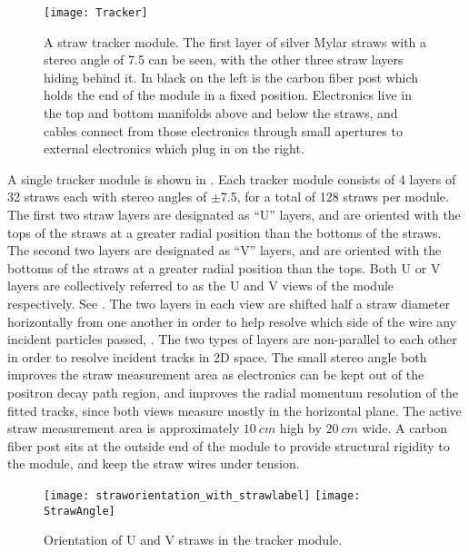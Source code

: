 \begin{figure}[]
    \centering
    \texttt{[image: Tracker]}
    \caption[Tracker module]{A straw tracker module. The first layer of silver Mylar straws with a stereo angle of 7.5\textdegree{} can be seen, with the other three straw layers hiding behind it. In black on the left is the carbon fiber post which holds the end of the module in a fixed position. Electronics live in the top and bottom manifolds above and below the straws, and cables connect from those electronics through small apertures to external electronics which plug in on the right.}
    \label{fig:tracker}
\end{figure}



A single tracker module is shown in . Each tracker module consists of 4 layers of 32 straws each with stereo angles of $\pm$7.5\textdegree{}, for a total of 128 straws per module. The first two straw layers are designated as ``U'' layers, and are oriented with the tops of the straws at a greater radial position than the bottoms of the straws. The second two layers are designated as ``V'' layers, and are oriented with the bottoms of the straws at a greater radial position than the tops. Both U or V layers are collectively referred to as the U and V views of the module respectively. See . The two layers in each view are shifted half a straw diameter horizontally from one another in order to help resolve which side of the wire any incident particles passed, . The two types of layers are non-parallel to each other in order to resolve incident tracks in 2D space. The small stereo angle both improves the straw measurement area as electronics can be kept out of the positron decay path region, and improves the radial momentum resolution of the fitted tracks, since both views measure mostly in the horizontal plane. The active straw measurement area is approximately $\SI{10}{cm}$ high by $\SI{20}{cm}$ wide. A carbon fiber post sits at the outside end of the module to provide structural rigidity to the module, and keep the straw wires under tension. 



\begin{figure}[]
\centering
        \texttt{[image: straworientation\_with\_strawlabel]}
    \hspace{1cm}
        \texttt{[image: StrawAngle]}
\caption[Tracker module coordinate system]{Orientation of U and V straws in the tracker module.}
\label{fig:trackermodulecoordsys}
\end{figure}



